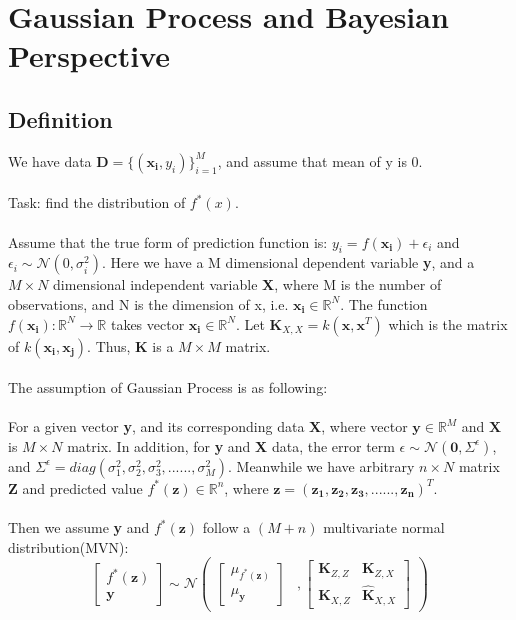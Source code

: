 \section{Gaussian Process and Bayesian Perspective}
\subsection{Definition}
We have data $\textbf{D} = \{ (\boldsymbol{x_i}, y_i) \} _{i=1} ^{M}$, and assume that mean of y is 0. 
\\ \\
Task: find the distribution of $ f^{*}(x) $.  
\\ \\
Assume that the true form of prediction function is: $y_i = f(\boldsymbol{x_i}) + \epsilon_i$ and $\epsilon_i \sim \mathcal{N}(0,\sigma_{i}^{2})$. Here we have a M dimensional dependent variable \textbf{y}, and a $M \times N$ dimensional independent variable \textbf{X}, where M is the number of observations, and N is the dimension of x, i.e. $\boldsymbol{x_i}\in \mathbb{R}^N $. The function 
$f(\boldsymbol{x_i}) : \mathbb{R}^N \to \mathbb{R}$ takes vector $\boldsymbol{x_i} \in \mathbb{R}^N$. Let $\boldsymbol{K}_{X, X} = k(\boldsymbol{x},\boldsymbol{x}^T)$ which is the matrix of $k(\boldsymbol{x_i}, \boldsymbol{x_j})$. Thus, \textbf{K} is a $M \times M$ matrix. 
\\ \\
The assumption of Gaussian Process is as following: \\ \\
For a given vector \textbf{y}, and its corresponding data \textbf{X}, where vector $ \boldsymbol{y} \in \mathbb{R}^M$ and $\boldsymbol{X}$ is $M \times N$ matrix. In addition, for \textbf{y} and \textbf{X} data, the error term $\epsilon \sim \mathcal{N}(\boldsymbol{0},\varSigma^{\epsilon})$, and $\varSigma^{\epsilon} = diag(\sigma_{1}^{2}, \sigma_{2}^{2}, \sigma_{3}^{2}, ......, \sigma_{M}^{2}) $.  Meanwhile we have arbitrary $n \times N$ matrix \textbf{Z} and predicted value $f^{*}(\boldsymbol{z}) \in \mathbb{R}^n$, where $ \boldsymbol{z} = (\boldsymbol{z_1, z_2, z_3, ......, z_n})^T$. \\ \\
Then we assume \textbf{y} and $f^{*}(\boldsymbol{z})$ follow a $(M + n)$ multivariate normal distribution(MVN): \\
\begin{equation}
\begin{bmatrix}
f^{*}(\boldsymbol{z}) \\
\boldsymbol{y} 
\end{bmatrix} \sim \mathcal{N}
\begin{pmatrix}
\begin{bmatrix}
\mu_{f^{*}(\boldsymbol{z})} \\ \mu_{\boldsymbol{y}}
\end{bmatrix} 
 & ,\begin{bmatrix}
\boldsymbol{K}_{Z, Z} & \boldsymbol{K}_{Z, X} \\
\boldsymbol{K}_{X, Z} & \hat{\boldsymbol{K}}_{X, X}
\end{bmatrix}
\end{pmatrix}
\end{equation}
